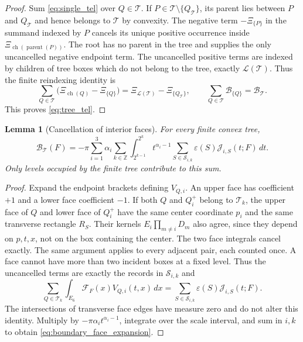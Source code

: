\documentclass[12pt,reqno]{amsart}
\theoremstyle{plain}
\newtheorem{lemma}[theorem]{Lemma}
\theoremstyle{definition}
\theoremstyle{remark}
\numberwithin{equation}{section}
\newcommand{\Z}{\mathbb Z}
\newcommand{\T}{\mathcal T}
\newcommand{\dd}{\,d}
\DeclareMathOperator{\ch}{ch}
\begin{document}
\begin{proof}
Sum \eqref{eq:single_tel} over $Q\in\T$. If
$P\in\T\setminus\{Q_\T\}$, its parent lies between $P$ and
$Q_\T$ and hence belongs to $\T$ by convexity. The negative term
$-\Xi_{\{P\}}$ in the summand indexed by $P$ cancels its unique
positive occurrence inside $\Xi_{\ch(\operatorname{parent}(P))}$.
The root has no parent in the tree and supplies the only uncancelled
negative endpoint term. The uncancelled positive terms are indexed
by children of tree boxes which do not belong to the tree, exactly
$\mathcal L(\T)$. Thus the finite reindexing identity is
\[
 \sum_{Q\in\T}\big(\Xi_{\ch(Q)}-\Xi_{\{Q\}}\big)
   =\Xi_{\mathcal L(\T)}-\Xi_{\{Q_\T\}},\qquad
 \sum_{Q\in\T}\mathcal B_{\{Q\}}=\mathcal B_\T.
\]
This proves \eqref{eq:tree_tel}.
\end{proof}

\begin{lemma}[Cancellation of interior faces]\label{lem:face_cancellation}
For every finite convex tree,
\begin{equation}\label{eq:boundary_face_expansion}
 \mathcal B_\T(F)
 =-\pi\sum_{i=1}^3\alpha_i\sum_{k\in\Z}
       \int_{2^{k-1}}^{2^k}t^{\alpha_i-1}
       \sum_{S\in\mathscr S_{i,k}}
             \varepsilon(S)\mathcal J_{i,S}(t;F)\dd t.
\end{equation}
Only levels occupied by the finite tree contribute to this sum.
\end{lemma}
\begin{proof}
Expand the endpoint brackets defining $V_{Q,i}$. An upper face has
coefficient $+1$ and a lower face coefficient $-1$. If both
$Q$ and $Q_i^+$ belong to $\T_k$, the upper face of $Q$ and lower
face of $Q_i^+$ have the same center coordinate $p_i$ and the same
transverse rectangle $R_S$. Their kernels $E_i\prod_{m\ne i}D_m$
also agree, since they depend on $p,t,x$, not on the box containing
the center. The two face integrals cancel exactly. The same argument
applies to every adjacent pair, each counted once. A face cannot have
more than two incident boxes at a fixed level. Thus the uncancelled
terms are exactly the records in $\mathscr S_{i,k}$ and
\[
 \sum_{Q\in\T_k}\int_{E_6}\mathcal F_F(x)V_{Q,i}(t,x)\dd x
       =\sum_{S\in\mathscr S_{i,k}}
                       \varepsilon(S)\mathcal J_{i,S}(t;F).
\]
The intersections of transverse face edges have measure zero and
do not alter this identity. Multiply by
$-\pi\alpha_it^{\alpha_i-1}$, integrate over the scale interval,
and sum in $i,k$ to obtain \eqref{eq:boundary_face_expansion}.
\end{proof}
\end{document}
